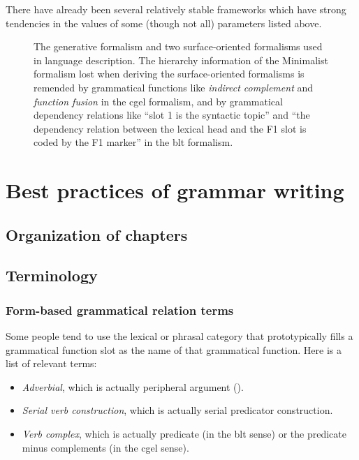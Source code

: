 \documentclass{article}
\newcommand*{\term}[1]{\emph{#1}}
\begin{document}
There have already been several relatively stable frameworks 
which have strong tendencies in the values of some (though not all) parameters listed above.

\begin{figure}
    \centering
    
    \caption{The generative formalism and two surface-oriented formalisms used in language description.
    The hierarchy information of the Minimalist formalism lost when deriving the surface-oriented formalisms 
    is remended by grammatical functions 
    like \term{indirect complement} and \term{function fusion} in the \ac{cgel} formalism,
    and by grammatical dependency relations like ``slot 1 is the syntactic topic''
    and ``the dependency relation between the lexical head and the F1 slot is coded by the F1 marker'' 
    in the \ac{blt} formalism.}
    \label{fig:three-formalism}
\end{figure}

\section{Best practices of grammar writing}


\subsection{Organization of chapters}

\subsection{Terminology}

\subsubsection{Form-based grammatical relation terms}\label{sec:form-based-function-name}

Some people tend to use the lexical or phrasal category 
that prototypically fills a grammatical function slot 
as the name of that grammatical function.
Here is a list of relevant terms:
\begin{itemize}
    \item \term{Adverbial}, which is actually peripheral argument ().
    \item \term{Serial verb construction}, which is actually serial predicator construction.
    \item \term{Verb complex}, which is actually predicate (in the \ac{blt} sense) 
    or the predicate minus complements (in the \ac{cgel} sense).
\end{itemize}
\end{document}
